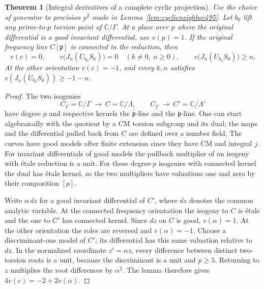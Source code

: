 \documentclass[a4paper,11pt]{article}
\newtheorem{theorem}[proposition]{Theorem}
\theoremstyle{definition}
\theoremstyle{remark}
\numberwithin{equation}{section}
\begin{document}
\begin{theorem}[Integral derivatives of a complete cyclic projection]\leavevmode
\label{thm:cyclicunit495}
Use the choice of generator to precision \(p^2\) made in
Lemma~\ref{lem:cyclicneighbor495}. Let \(b_0\) lift any
prime-to-\(p\) torsion point of \(\mathbb C/\Gamma\).
At a place over \(p\) where the original differential is a good
invariant differential, use \(v(p)=1\). If the original frequency
line \(C[\mathfrak p]\) is connected in the reduction, then
\[
 v(c)=0,\qquad
 v\big(J_n(U_{b_0}S_k)\big)=0\quad (k\ne0,\ n\ge0),
 \qquad v\big(J_n(U_{b_0}S_0)\big)\ge n .
\]
At the other orientation \(v(c)=-1\), and every \(k,n\) satisfies
\(v(J_n(U_{b_0}S_k))\ge-1-n\).
\end{theorem}
\begin{proof}
The two isogenies
\[
    C_\Gamma=\mathbb C/\Gamma\ \longrightarrow\
    C=\mathbb C/\Lambda,\qquad
    C_\Gamma\ \longrightarrow\ C'=\mathbb C/\Lambda'
\]
have degree \(p\) and respective kernels the
\(\bar{\mathfrak p}\)-line and the \(\mathfrak p\)-line. One
can start algebraically with the quotient by a CM torsion
subgroup and its dual; the maps and the differential pulled
back from \(C\) are defined over a number field. The curves
have good models after finite extension since they have CM
and integral \(j\). For invariant differentials of good models
the pullback multiplier of an isogeny with \'etale reduction is
a unit. For these degree-\(p\) isogenies with connected kernel
the dual has \'etale kernel, so the two multipliers have
valuations one and zero by their composition \([p]\).

Write \(\alpha\,dz\) for a good invariant differential of
\(C'\), where \(dz\) denotes the common analytic variable.
At the connected frequency orientation the isogeny to \(C\)
is \'etale and the one to \(C'\) has connected kernel. Since
\(dz\) on \(C\) is good, \(v(\alpha)=1\). At the other
orientation the roles are reversed and \(v(\alpha)=-1\).
Choose a discriminant-one model of \(C'\); its differential
has this same valuation relative to \(dz\).
In the normalized coordinate \(z'=\alpha z\), every difference
between distinct two-torsion roots is a unit, because the
discriminant is a unit and \(p\ge5\). Returning to \(z\)
multiplies the root differences by \(\alpha^2\).
The lemma therefore gives \(4v(c)=-2+2v(\alpha)\).


\end{proof}
\end{document}
